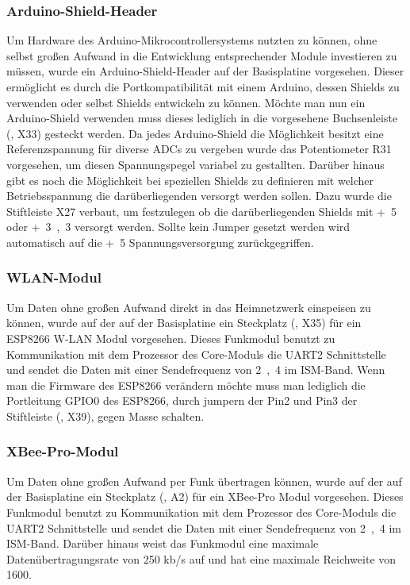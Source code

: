 \subsubsection{Arduino-Shield-Header}
Um Hardware des Arduino-Mikrocontrollersystems nutzten zu können, ohne selbst großen Aufwand in die Entwicklung entsprechender Module investieren zu müssen, wurde ein Arduino-Shield-Header auf der \gls{Basisplatine} vorgesehen. Dieser ermöglicht es durch die Portkompatibilität mit einem Arduino, dessen Shields zu verwenden oder selbst Shields entwickeln zu können. Möchte man nun ein Arduino-Shield verwenden muss dieses lediglich in die vorgesehene Buchsenleiste (, X33) gesteckt werden. Da jedes Arduino-Shield die Möglichkeit besitzt eine Referenzspannung für diverse ADCs zu vergeben wurde das Potentiometer R31 vorgesehen, um diesen Spannungspegel variabel zu gestallten. Darüber hinaus gibt es noch die Möglichkeit bei speziellen Shields zu definieren mit welcher Betriebsspannung die darüberliegenden versorgt werden sollen. Dazu wurde die Stiftleiste X27 verbaut, um festzulegen ob die darüberliegenden Shields mit \unit{+5}{\volt} oder \unit{+3,3}{\volt} versorgt werden. Sollte kein Jumper gesetzt werden wird automatisch auf die \unit{+5}{\volt} Spannungsversorgung zurückgegriffen.


\subsubsection{WLAN-Modul}
Um Daten ohne großen Aufwand direkt in das Heimnetzwerk einspeisen zu können, wurde auf der auf der \gls{Basisplatine} ein Steckplatz (, X35) für ein ESP8266 W-LAN Modul vorgesehen. Dieses Funkmodul benutzt zu Kommunikation mit dem Prozessor des Core-Moduls die UART2 Schnittstelle und sendet die Daten mit einer Sendefrequenz von \unit{2,4}{\giga\hertz} im ISM-Band. Wenn man die Firmware des ESP8266 verändern möchte muss man lediglich die Portleitung GPIO0 des ESP8266, durch jumpern der Pin2 und Pin3 der Stiftleiste (, X39), gegen Masse schalten.


\subsubsection{XBee-Pro-Modul}
Um Daten ohne großen Aufwand per Funk übertragen können, wurde auf der auf der \gls{Basisplatine} ein Steckplatz (, A2) für ein XBee-Pro Modul vorgesehen. Dieses Funkmodul benutzt zu Kommunikation mit dem Prozessor des \gls{Core-Modul}s die UART2 Schnittstelle und sendet die Daten mit einer Sendefrequenz von \unit{2,4}{\giga\hertz} im ISM-Band. Darüber hinaus weist das Funkmodul eine maximale Datenübertragungsrate von 250 kb/s auf und hat eine maximale Reichweite von \unit{1600}{\metre}.

